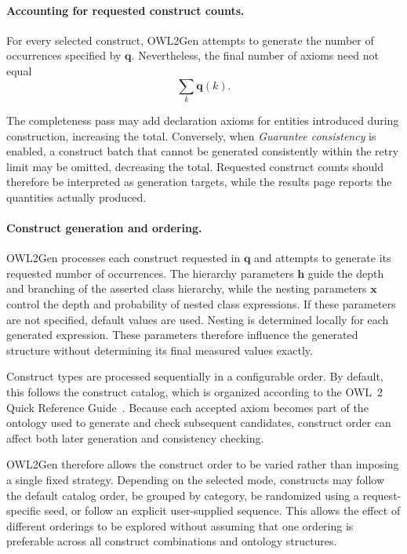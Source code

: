 \paragraph{Accounting for requested construct counts.}

For every selected construct, OWL2Gen attempts to generate the number of
occurrences specified by $\mathbf{q}$. Nevertheless, the final number of
axioms need not equal
\[
\sum_k \mathbf{q}(k).
\]

The completeness pass may add declaration axioms for entities introduced
during construction, increasing the total. Conversely, when
\emph{Guarantee consistency} is enabled, a construct batch that cannot be
generated consistently within the retry limit may be omitted, decreasing
the total. Requested construct counts should therefore be interpreted as
generation targets, while the results page reports the quantities actually
produced.

\paragraph{Construct generation and ordering.}

OWL2Gen processes each construct requested in $\mathbf{q}$ and attempts to
generate its requested number of occurrences. The hierarchy parameters
$\mathbf{h}$ guide the depth and branching of the asserted class hierarchy,
while the nesting parameters $\mathbf{x}$ control the depth and probability
of nested class expressions. If these parameters are not specified, default
values are used. Nesting is determined locally for each generated expression.
These parameters therefore influence the generated structure without
determining its final measured values exactly.

Construct types are processed sequentially in a configurable order. By
default, this follows the construct catalog, which is organized according to
the OWL~2 Quick Reference Guide~\cite{owl2quickreference}. Because each
accepted axiom becomes part of the ontology used to generate and check
subsequent candidates, construct order can affect both later generation and
consistency checking.

OWL2Gen therefore allows the construct order to be varied rather than imposing
a single fixed strategy. Depending on the selected mode, constructs may follow
the default catalog order, be grouped by category, be randomized using a
request-specific seed, or follow an explicit user-supplied sequence. This
allows the effect of different orderings to be explored without assuming that
one ordering is preferable across all construct combinations and ontology
structures.


